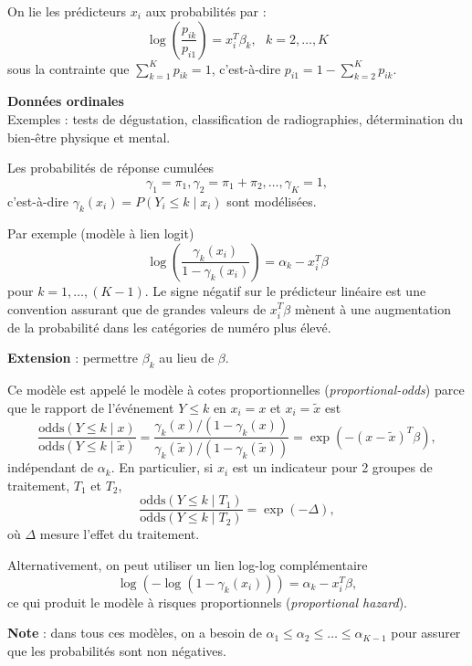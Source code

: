 \documentclass{BeamerTemplate}
\begin{document}
\begin{refsection}
\begin{frame}{}
\bigskip
On lie les prédicteurs $x_i$ aux probabilités par :
$$\log\left(\frac{p_{ik}}{p_{i1}} \right) = x_i^T \beta_k, \ \ \ k=2,\ldots,K$$
sous la contrainte que $\sum_{k=1}^K p_{ik}=1$, c'est-à-dire $p_{i1}=1-
\sum_{k=2}^K p_{ik}$. 


\end{frame}


\begin{frame}{}

\textbf{Données ordinales}\\
Exemples : tests de dégustation, classification de radiographies, détermination du
bien-être physique et mental. 

\smallskip
Les probabilités de réponse cumulées 
$$\gamma_1 = \pi_1, \gamma_2=\pi_1+\pi_2, \ldots, \gamma_K=1,$$
c'est-à-dire $\gamma_k(x_i) = P(Y_i \leq k \mid x_i)$ sont modélisées. 

\bigskip
Par exemple (modèle à lien logit)
$$\log\left(\frac{\gamma_k(x_i)}{1-\gamma_k(x_i)} \right) = \alpha_k - x_i^T \beta$$
pour $k=1, \ldots, (K-1)$. Le signe négatif sur le prédicteur linéaire est une
convention assurant que de grandes valeurs de $x_i^T \beta$ mènent à une augmentation de
la probabilité dans les catégories de numéro plus élevé.

\bigskip
\textbf{Extension} : permettre $\beta_k$ au lieu de $\beta$.
\end{frame}


\begin{frame}{}

Ce modèle est appelé le modèle à
{\color{blue}cotes proportionnelles} (\textit{proportional-odds}) parce que le rapport de l'événement $Y \leq k$
en $x_i=x$ et $x_i = \tilde{x}$ est
$$\frac{\mbox{odds}(Y\leq k\mid x)}{\mbox{odds}(Y\leq k\mid
\tilde{x})} = \frac{\gamma_k(x)/(1-\gamma_k(x))}{\gamma_k(\tilde{x}) / 
(1-\gamma_k(\tilde{x}))} = \exp(-(x-\tilde{x})^T \beta),$$
indépendant de $\alpha_k$. En particulier, si $x_i$ est un indicateur pour 2
groupes de traitement, $T_1$ et 
$T_2$, 
$$\frac{\mbox{odds}(Y\leq k \mid T_1)}{\mbox{odds}(Y\leq k\mid
T_2)}= \exp(-\Delta),$$
où $\Delta$ mesure l'effet du traitement.

\smallskip
Alternativement, on peut utiliser un lien log-log complémentaire
$$ \log\left(-\log(1-\gamma_k(x_i))\right)= \alpha_k - x_i^T \beta,$$
ce qui produit le modèle à {\color{blue}risques proportionnels} (\textit{proportional hazard}).

\bigskip
\textbf{Note} : dans tous ces modèles, on a besoin de $\alpha_1 \leq \alpha_2 \leq
\ldots \leq \alpha_{K-1}$  pour assurer que les probabilités sont non négatives.
\end{frame}


\end{refsection}
\end{document}
